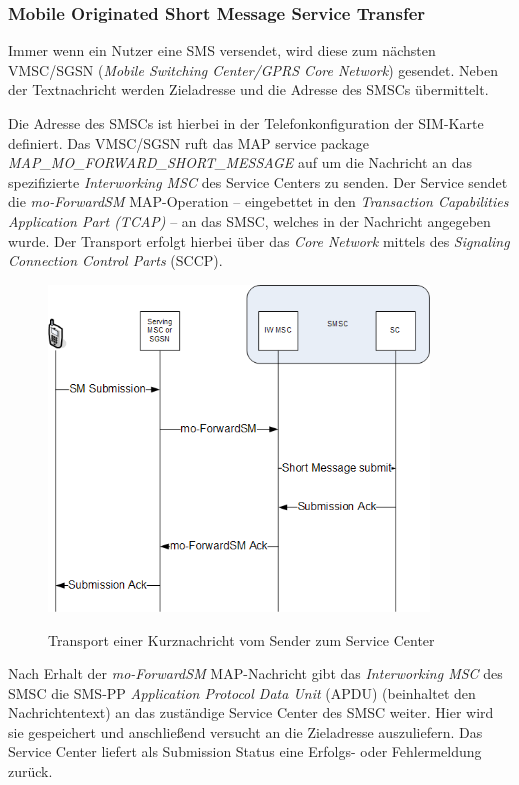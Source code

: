 \documentclass[german,12pt,a4paper]{article}
\begin{document}
\subsubsection{Mobile Originated Short Message Service Transfer}
Immer wenn ein Nutzer eine SMS versendet, wird diese zum nächsten VMSC/SGSN (\textit{Mobile Switching 
Center/GPRS Core Network}) gesendet. Neben der Textnachricht werden Zieladresse und die Adresse des 
SMSCs übermittelt. 

Die Adresse des SMSCs ist hierbei in der Telefonkonfiguration der SIM-Karte definiert\cite{3gpp:smpp}. Das VMSC/SGSN 
ruft das MAP service package \textit{MAP\_MO\_FORWARD\_SHORT\_\-MESSAGE} auf um die Nachricht an das spezifizierte 
\textit{Interworking MSC} des Service Centers zu senden. Der Service sendet die \textit{mo-ForwardSM} MAP-Operation --
eingebettet in den \textit{Transaction Capabilities Application Part (TCAP)} -- an das SMSC, welches in der 
Nachricht angegeben wurde. Der Transport erfolgt hierbei über das \textit{Core Network} mittels des \textit{Signaling 
Connection Control Parts} (SCCP)\cite{3gpp:smpp}.

\begin{figure}[htm]
    \centering
	\includegraphics[width=0.9\textwidth]{img/mo-forward-sm.png}
    \label{fig:mo-forward-sm}
    \caption{Transport einer Kurznachricht vom Sender zum Service Center}
\end{figure}	

Nach Erhalt der \textit{mo-ForwardSM} MAP-Nachricht gibt das \textit{Interworking MSC} des SMSC die SMS-PP \textit{Application 
Protocol Data Unit} (APDU) (beinhaltet den Nachrichtentext) an das zuständige Service Center des SMSC 
weiter\cite{3gpp:techrel}. Hier wird sie gespeichert und anschließend versucht an die Zieladresse auszuliefern. Das 
Service Center liefert als Submission Status eine Erfolgs- oder Fehlermeldung zurück.
\end{document}
